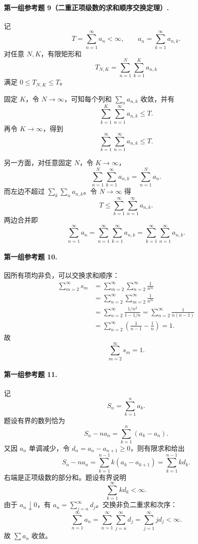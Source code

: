 \paragraph{第一组参考题 9（二重正项级数的求和顺序交换定理）.}
\begin{xsolution}
记
\[
 T=\sum_{n=1}^{\infty}a_n<\infty,
 \qquad
 a_n=\sum_{k=1}^{\infty}a_{n,k}.
\]
对任意 $N,K$，有限矩形和
\[
 T_{N,K}=\sum_{n=1}^{N}\sum_{k=1}^{K}a_{n,k}
\]
满足 $0\leq T_{N,K}\leq T$。

固定 $K$，令 $N\to\infty$，可知每个列和 $\sum_n a_{n,k}$ 收敛，并有
\[
 \sum_{k=1}^{K}\sum_{n=1}^{\infty}a_{n,k}\leq T.
\]
再令 $K\to\infty$，得到
\[
 \sum_{k=1}^{\infty}\sum_{n=1}^{\infty}a_{n,k}\leq T.
\]

另一方面，对任意固定 $N$，令 $K\to\infty$，
\[
 \sum_{n=1}^{N}\sum_{k=1}^{\infty}a_{n,k}
 =\sum_{n=1}^{N}a_n.
\]
而左边不超过 $\sum_k\sum_n a_{n,k}$。令 $N\to\infty$ 得
\[
 T\leq\sum_{k=1}^{\infty}\sum_{n=1}^{\infty}a_{n,k}.
\]
两边合并即
\[
 \boxed{
 \sum_{n=1}^{\infty}a_n
 =\sum_{n=1}^{\infty}\sum_{k=1}^{\infty}a_{n,k}
 =\sum_{k=1}^{\infty}\sum_{n=1}^{\infty}a_{n,k}.}
\]
\end{xsolution}

\paragraph{第一组参考题 10.}
\begin{xsolution}
因所有项均非负，可以交换求和顺序：
\[
 \begin{aligned}
 \sum_{m=2}^{\infty}s_m
 &=\sum_{m=2}^{\infty}\sum_{n=2}^{\infty}\frac1{n^m}\\
 &=\sum_{n=2}^{\infty}\sum_{m=2}^{\infty}\frac1{n^m}\\
 &=\sum_{n=2}^{\infty}\frac{1/n^2}{1-1/n}
 =\sum_{n=2}^{\infty}\frac1{n(n-1)}\\
 &=\sum_{n=2}^{\infty}\left(\frac1{n-1}-\frac1n\right)=1.
 \end{aligned}
\]
故
\[
 \boxed{\sum_{m=2}^{\infty}s_m=1.}
\]
\end{xsolution}

\paragraph{第一组参考题 11.}
\begin{xsolution}
记
\[
 S_n=\sum_{k=1}^{n}a_k.
\]
题设有界的数列恰为
\[
 S_n-na_n
 =\sum_{k=1}^{n}(a_k-a_n).
\]
又因 $a_n$ 单调减少，令 $d_n=a_n-a_{n+1}\geq0$，则有限求和给出
\[
 S_n-na_n=\sum_{k=1}^{n-1}k(a_k-a_{k+1})
 =\sum_{k=1}^{n-1}kd_k.
\]
右端是正项级数的部分和。题设有界说明
\[
 \sum_{k=1}^{\infty}kd_k<\infty.
\]
由于 $a_n\downarrow0$，有 $a_n=\sum_{j=n}^{\infty}d_j$。交换非负二重求和次序：
\[
 \sum_{n=1}^{\infty}a_n
 =\sum_{n=1}^{\infty}\sum_{j=n}^{\infty}d_j
 =\sum_{j=1}^{\infty}j d_j<\infty.
\]
故 $\sum a_n$ 收敛。
\end{xsolution}

